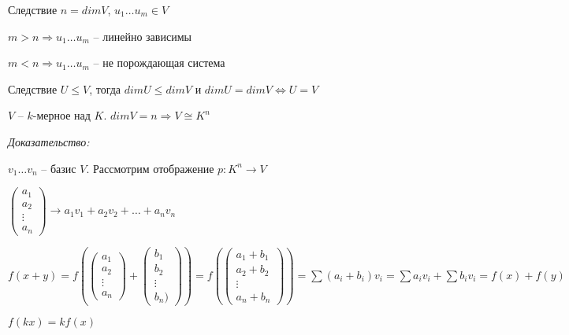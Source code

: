 \documentclass[12pt]{article}
\begin{document}
\begin{theo}{Следствие}
    $n = dimV$, $u_1 \ldots u_m \in V$

    $m > n \Rightarrow u_1 \ldots u_m$ -- линейно зависимы

    $m < n \Rightarrow u_1 \ldots u_m$ -- не порождающая система
\end{theo}

\begin{theo}{Следствие}
    $U \leq V$, тогда $dimU \leq dimV$ и $dimU = dimV \Leftrightarrow U = V$
\end{theo}

\begin{theo}{}
    $V$ -- $k$-мерное над $K$. $dimV = n \Rightarrow V \cong K^n$
\end{theo}

\textit{Доказательство:}

$v_1 \ldots v_n$ -- базис $V$. Рассмотрим отображение $p : K^n \rightarrow V$

$\left( \begin{gathered}
    a_1 \\
    a_2 \\
    \vdots \\
    a_n
\end{gathered} \right) \rightarrow a_1v_1 + a_2v_2 + \ldots + a_nv_n$

$f(x + y) = f(\left( \begin{gathered}
    a_1 \\
    a_2 \\
    \vdots \\
    a_n
\end{gathered} \right) + \left( \begin{gathered}
    b_1 \\
    b_2 \\
    \vdots \\
    b_n)
\end{gathered} \right) ) = f(\left( \begin{gathered} 
    a_1 + b_1 \\
    a_2 + b_2 \\
    \vdots \\
    a_n + b_n
\end{gathered} \right)) = \sum (a_i + b_i)v_i = \sum a_iv_i + \sum b_iv_i = f(x) + f(y)$

\begin{Exercise}{}
    $f(kx) = kf(x)$
\end{Exercise}
\end{document}
